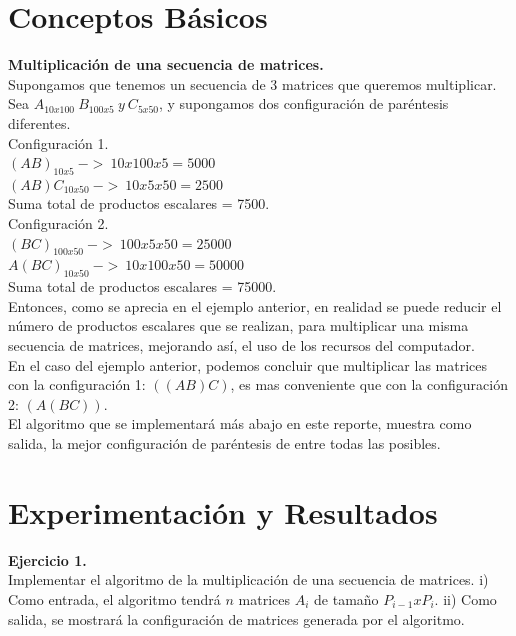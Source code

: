 \documentclass[12pt]{report}
\begin{document}
	\section{Conceptos Básicos}
	\textbf{Multiplicación de una secuencia de matrices.}\\
		
	Supongamos que tenemos un secuencia de 3 matrices que queremos multiplicar.\\
	
	Sea $A_{10x100} \ B_{100x5} \ y \ C_{5x50}$, y supongamos dos configuración de paréntesis diferentes.\\
	
	Configuración 1.\\
	$(AB)_{10x5} \ -> \ 10x100x5 = 5000$\\
	$(AB)C_{10x50} \ -> \ 10x5x50 = 2500$\\
	Suma total de productos escalares = 7500.\\
	
	Configuración 2.\\
	$(BC)_{100x50} \ -> \ 100x5x50 = 25000$\\
	$A(BC)_{10x50} \ -> \ 10x100x50 = 50000$\\
	Suma total de productos escalares = 75000.\\
	
	Entonces, como se aprecia en el ejemplo anterior, en realidad se puede reducir el número de productos escalares que se realizan, para multiplicar una misma secuencia de matrices, mejorando así, el uso de los recursos del computador. \\En el caso del ejemplo anterior, podemos concluir que multiplicar las matrices con la configuración 1: $((AB)C)$, es mas conveniente que con la configuración 2: $(A(BC))$.\\
	El algoritmo que se implementará más abajo en este reporte, muestra como salida, la mejor configuración de paréntesis de entre todas las posibles.	
	
		
	\newpage
	
	
	\section{Experimentación y Resultados}	
	\textbf{Ejercicio 1.}\\
	Implementar el algoritmo de la multiplicación de una secuencia de matrices.\newline
	i) Como entrada, el algoritmo tendrá $n$ matrices $A_{i}$ de tamaño $P_{i-1}xP_{i}$.\newline
	ii) Como salida, se mostrará la configuración de matrices generada por el algoritmo. \\
	
\end{document}
